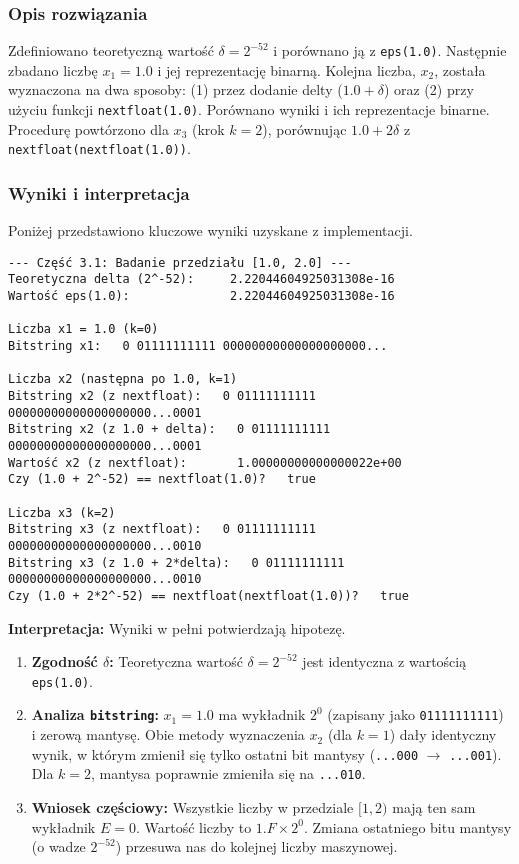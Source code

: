 \documentclass[11pt, a4paper]{article}
\begin{document}
\subsubsection{Opis rozwiązania}
Zdefiniowano teoretyczną wartość $\delta = 2^{-52}$ i porównano ją z \texttt{eps(1.0)}. Następnie zbadano liczbę $x_1 = 1.0$ i jej reprezentację binarną. Kolejna liczba, $x_2$, została wyznaczona na dwa sposoby: (1) przez dodanie delty ($1.0 + \delta$) oraz (2) przy użyciu funkcji \texttt{nextfloat(1.0)}. Porównano wyniki i ich reprezentacje binarne. Procedurę powtórzono dla $x_3$ (krok $k=2$), porównując $1.0 + 2\delta$ z \texttt{nextfloat(nextfloat(1.0))}.

\subsubsection{Wyniki i interpretacja}
Poniżej przedstawiono kluczowe wyniki uzyskane z implementacji.
\begin{verbatim}
--- Część 3.1: Badanie przedziału [1.0, 2.0] ---
Teoretyczna delta (2^-52):     2.22044604925031308e-16
Wartość eps(1.0):              2.22044604925031308e-16

Liczba x1 = 1.0 (k=0)
Bitstring x1:   0 01111111111 00000000000000000000...

Liczba x2 (następna po 1.0, k=1)
Bitstring x2 (z nextfloat):   0 01111111111 00000000000000000000...0001
Bitstring x2 (z 1.0 + delta):   0 01111111111 00000000000000000000...0001
Wartość x2 (z nextfloat):       1.00000000000000022e+00
Czy (1.0 + 2^-52) == nextfloat(1.0)?   true

Liczba x3 (k=2)
Bitstring x3 (z nextfloat):   0 01111111111 00000000000000000000...0010
Bitstring x3 (z 1.0 + 2*delta):   0 01111111111 00000000000000000000...0010
Czy (1.0 + 2*2^-52) == nextfloat(nextfloat(1.0))?   true
\end{verbatim}

\noindent \textbf{Interpretacja:}
Wyniki w pełni potwierdzają hipotezę.
\begin{enumerate}
    \item \textbf{Zgodność $\delta$:} Teoretyczna wartość $\delta = 2^{-52}$ jest identyczna z wartością \texttt{eps(1.0)}.
    \item \textbf{Analiza \texttt{bitstring}:} $x_1 = 1.0$ ma wykładnik $2^0$ (zapisany jako \texttt{01111111111}) i zerową mantysę. Obie metody wyznaczenia $x_2$ (dla $k=1$) dały identyczny wynik, w którym zmienił się tylko ostatni bit mantysy (\texttt{...000} $\to$ \texttt{...001}). Dla $k=2$, mantysa poprawnie zmieniła się na \texttt{...010}.
    \item \textbf{Wniosek częściowy:} Wszystkie liczby w przedziale $[1, 2)$ mają ten sam wykładnik $E=0$. Wartość liczby to $1.F \times 2^0$. Zmiana ostatniego bitu mantysy (o wadze $2^{-52}$) przesuwa nas do kolejnej liczby maszynowej.
\end{enumerate}
\end{document}
